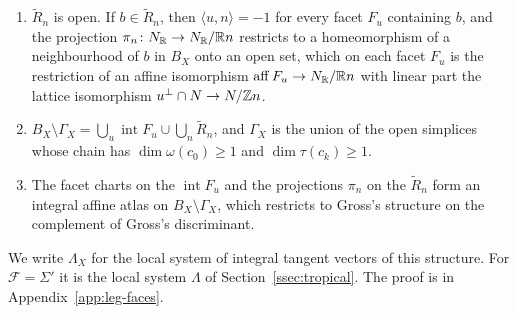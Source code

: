 \begin{lemma}[charts]\label{lem:charts}
\begin{enumerate}
\item $\widetilde R_n$ is open. If $b\in\widetilde R_n$, then $\langle u,n\rangle=-1$ for every facet $F_u$ containing
$b$, and the projection $\pi_n\colon N_\mathbb R\to N_\mathbb R/\mathbb R n$ restricts to a homeomorphism of a neighbourhood of $b$ in $B_X$
onto an open set, which on each facet $F_u$ is the restriction of an affine isomorphism $\operatorname{aff}F_u\to
N_\mathbb R/\mathbb R n$ with linear part the lattice isomorphism $u^\perp\cap N\to N/\mathbb Z n$.
\item $B_X\setminus\Gamma_X=\bigcup_u\operatorname{int}F_u\cup\bigcup_n\widetilde R_n$, and $\Gamma_X$ is the union of the
open simplices whose chain has $\dim\omega(c_0)\ge1$ and $\dim\tau(c_k)\ge1$.
\item The facet charts on the $\operatorname{int}F_u$ and the projections $\pi_n$ on the $\widetilde R_n$ form an integral
affine atlas on $B_X\setminus\Gamma_X$, which restricts to Gross's structure \cite[Prop.~3.14]{Gross2005} on the
complement of Gross's discriminant.
\end{enumerate}
\end{lemma}
We write $\Lambda_X$ for the local system of integral tangent vectors of this structure. For $\mathcal F=\Sigma'$ it is
the local system $\Lambda$ of Section~\ref{ssec:tropical}. The proof is in Appendix~\ref{app:leg-faces}.

